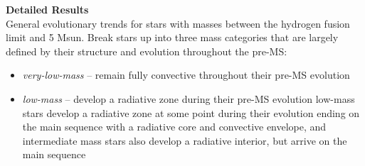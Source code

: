 \textbf{Detailed Results} \\
General evolutionary trends for stars with masses between the hydrogen fusion limit and 5 Msun. Break stars up into three mass categories that are largely defined by their structure and evolution throughout the pre-MS: 
\begin{itemize}
 \item[] {\it very-low-mass} -- remain fully convective throughout their pre-MS evolution
 \item[] {\it low-mass} -- develop a radiative zone during their pre-MS evolution
low-mass stars develop a radiative zone at some point during their evolution ending on the main sequence with a radiative core and convective envelope, and intermediate mass stars also develop a radiative interior, but arrive on the main sequence
\end{itemize}